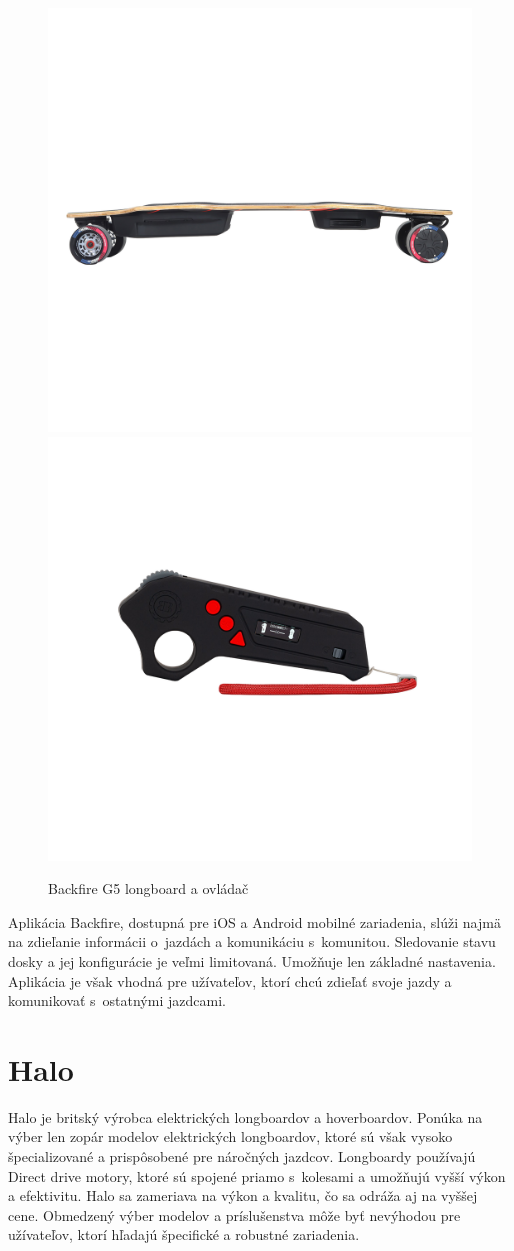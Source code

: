 \begin{figure}[h]
    \centering
    \includegraphics[width=0.48\linewidth]{obrazky-figures/brand-reviews/backfire-longboard.png}\hfill
    \includegraphics[width=0.48\linewidth]{obrazky-figures/brand-reviews/backfire-controller.png}
    \caption{Backfire G5 longboard a ovládač\cite{Backfire}}\label{fig:backfire}
\end{figure}

Aplikácia Backfire, dostupná pre iOS a Android mobilné zariadenia, slúži najmä na zdieľanie informácii o~jazdách a komunikáciu s~komunitou.
Sledovanie stavu dosky a jej konfigurácie je veľmi limitovaná.
Umožňuje len základné nastavenia.
Aplikácia je však vhodná pre užívateľov, ktorí chcú zdieľať svoje jazdy a komunikovať s~ostatnými jazdcami.\cite{Backfire}

\section{Halo}
Halo je britský výrobca elektrických longboardov a hoverboardov.
Ponúka na výber len zopár modelov elektrických longboardov, ktoré sú však vysoko špecializované a prispôsobené pre náročných jazdcov.
Longboardy používajú Direct drive motory, ktoré sú spojené priamo s~kolesami a umožňujú vyšší výkon a efektivitu.
Halo sa zameriava na výkon a kvalitu, čo sa odráža aj na vyššej cene.
Obmedzený výber modelov a príslušenstva môže byť nevýhodou pre užívateľov, ktorí hľadajú špecifické a robustné zariadenia.

